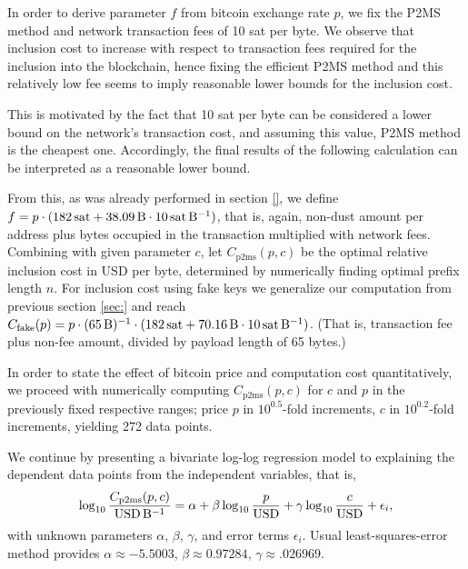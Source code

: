 \documentclass[a4paper,11pt,titlepage]{scrbook}
\begin{document}
In order to derive parameter $f$ from bitcoin exchange rate $p$, we fix the P2MS method and network transaction fees of 10 sat per byte.
We observe that inclusion cost to increase with respect to transaction fees required for the inclusion into the blockchain, hence fixing the efficient P2MS method and this relatively low fee seems to imply reasonable lower bounds for the inclusion cost.


This is motivated by the fact that 10 sat per byte can be considered a lower bound on the network's transaction cost, and assuming this value, P2MS method is the cheapest one.
Accordingly, the final results of the following calculation can be interpreted as a reasonable lower bound.

From this, as was already performed in section \ref{}, we define $f = p \cdot (182\,\text{sat} + \SI{38.09}{\byte}\cdot 10\,\text{sat}\,\si{\per\byte})$, that is, again, non-dust amount per address plus bytes occupied in the transaction multiplied with network fees.
Combining with given parameter $c$, let $C_\text{p2ms}(p,c)$ be the optimal relative inclusion cost in USD per byte, determined by numerically finding optimal prefix length $n$.
For inclusion cost using fake keys we generalize our computation from previous section \ref{sec:} and reach $C_\text{fake}(p) = p \cdot (\SI{65}{\byte})^{-1} \cdot (182\,\text{sat} + \SI{70.16}{\byte}\cdot 10\,\text{sat}\,\si{\per\byte})$. (That is, transaction fee plus non-fee amount, divided by payload length of 65 bytes.)

In order to state the effect of bitcoin price and computation cost quantitatively, we proceed with numerically computing $C_\text{p2ms}(p,c)$ for $c$ and $p$ in the previously fixed respective ranges; price $p$ in $10^{0.5}$-fold increments, $c$ in $10^{0.2}$-fold increments, yielding 272 data points.

We continue by presenting a bivariate log-log regression model to explaining the dependent data points from the independent variables, that is,
\begin{equation} \log_{10} \frac{C_\text{p2ms}(p, c)}{\text{USD}\,\si{\per\byte}} = \alpha + \beta \log_{10} \frac{p}{\text{USD}} + \gamma \log_{10} \frac{c}{\text{USD}} + \epsilon_i, \label{eq:regressionmodel}\end{equation}
with unknown parameters $\alpha$, $\beta$, $\gamma$, and error terms $\epsilon_i$.
Usual least-squares-error method provides $\alpha \approx \num{-5.5003}$, $\beta \approx\num{0.97284}$, $\gamma \approx\num{.026969}$.
\end{document}
